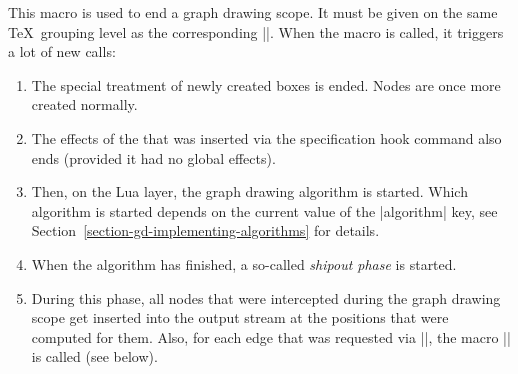 \begin{command}{\pgfgdendscope}
  This macro is used to end a graph drawing scope. It must be given on
  the same \TeX\ grouping level as the corresponding
  |\pgfgdbeginscope|. When the macro is called, it triggers a lot of
  new calls:
  \begin{enumerate}
  \item The special treatment of newly created boxes is ended. Nodes
    are once more created normally.
  \item The effects of the  that was inserted via the
    specification hook command also ends (provided it had no global
    effects).
  \item Then, on the Lua layer, the graph drawing algorithm is
    started. Which algorithm is started depends on the current value
    of the |algorithm| key, see
    Section~\ref{section-gd-implementing-algorithms} for details.
  \item When the algorithm has finished, a so-called \emph{shipout
      phase} is started.
  \item During this phase, all nodes that were intercepted during the
    graph drawing scope get inserted into the output stream at the
    positions that were computed for them. Also, for each edge that
    was requested via |\pgfgdedge|, the macro |\pgfgdedgecallback| is
    called (see below).


\end{enumerate}
\end{command}
